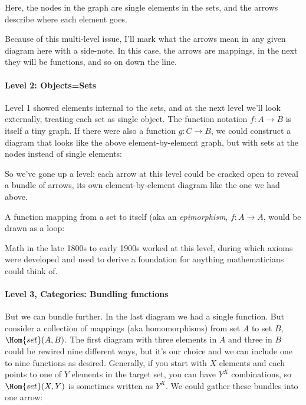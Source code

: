 \documentclass[11pt]{article}
\begin{document}
Here, the nodes in the graph are single elements in the sets, and the arrows describe
where each element goes.

Because of this multi-level issue, I'll mark what the arrows mean in any given diagram
here with a side-note. In this case, the arrows are mappings, in the next they will be
functions, and so on down the line.

\paragraph{Level 2: Objects=Sets}
Level 1 showed elements internal to the sets, and at the next level we'll look externally,
treating each set as single object.
The function notation $f:A\to B$ is itself a tiny graph. If there were also a function
$g:C\to B$, we could construct a diagram that looks like the above element-by-element
graph, but with sets at the nodes instead of single elements:

So we've gone up a level: each arrow at this level could be cracked open to reveal
a bundle of arrows, its own element-by-element diagram like the one we had above.

A function mapping from a set to itself (aka an {\em epimorphism}, $f:A\to A$, would be drawn as a loop:


Math in the late 1800s to early 1900s worked at this level, during which axioms
were developed and used to derive a foundation for anything mathematicians could think of.

\paragraph{Level 3, Categories: Bundling functions} \label{homsetsec}
But we can bundle further. In the last
diagram we had a single function. But consider a collection of mappings (aka homomorphisms)
from set $A$ to set $B$, $\Hom{set}(A, B)$.
The first diagram with three elements in $A$ and
three in $B$ could be rewired nine different ways, but it's our choice and we can include
one to nine functions as desired. Generally, if you start with $X$ elements and each
points to one of $Y$ elements in the target set, you can have $Y^X$ combinations, so 
$\Hom{set}(X, Y)$ is sometimes written as $Y^X$.  We could gather these bundles into one
arrow:
\end{document}
